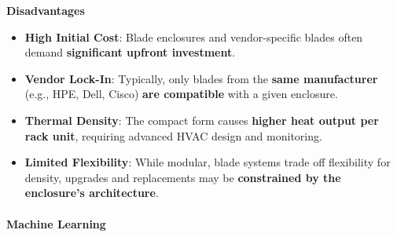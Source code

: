 \highspace
\begin{flushleft}
    \textcolor{Red2}{ \textbf{Disadvantages}}
\end{flushleft}
\begin{itemize}[label=\textcolor{Red2}{}]
    \item \textcolor{Red2}{\textbf{High Initial Cost}}: Blade enclosures and vendor-specific blades often demand \textbf{significant upfront investment}.
    \item \textcolor{Red2}{\textbf{Vendor Lock-In}}: Typically, only blades from the \textbf{same manufacturer} (e.g., HPE, Dell, Cisco) \textbf{are compatible} with a given enclosure.
    \item \textcolor{Red2}{\textbf{Thermal Density}}: The compact form causes \textbf{higher heat output per rack unit}, requiring advanced HVAC design and monitoring.
    \item \textcolor{Red2}{\textbf{Limited Flexibility}}: While modular, blade systems trade off flexibility for density, upgrades and replacements may be \textbf{constrained by the enclosure's architecture}.
\end{itemize}

\newpage

\paragraph{Machine Learning}

